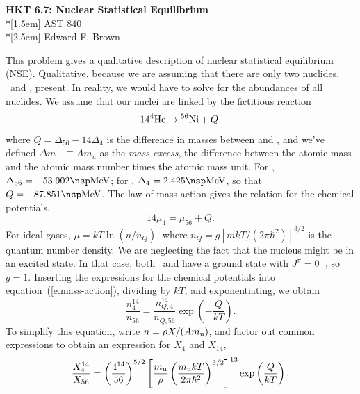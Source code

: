 \documentclass[11pt]{article}
\begin{document}
\newcommand{\thetitle}{HKT 6.7: Nuclear Statistical Equilibrium}
\newcommand{\thecourse}{AST 840}
\newcommand{\theauthor}{Edward F. Brown}

\begin{titlepage}
\begin{center}
\LARGE{\textbf{\thetitle}}\\*[1.5em]
\Large{\thecourse}\\*[2.5em]
\large{\theauthor}
\end{center}
\end{titlepage}

This problem gives a qualitative description of nuclear statistical equilibrium (NSE).  Qualitative, because we are assuming that there are only two nuclides, \helium\ and \nickel[56], present. In reality, we would have to solve for the abundances of all nuclides.  We assume that our nuclei are linked by the fictitious reaction
\begin{equation}\label{e.chem}
14\helium \to \nickel[56] + Q,
\end{equation}
where $Q = \Delta_{56} - 14\Delta_{4}$ is the difference in masses between \nickel[56] and \helium, and we've defined $\Delta m - \equiv A m_{u}$ as the \emph{mass excess}, the difference between the atomic mass and the atomic mass number times the atomic mass unit.  For \nickel[56], $\Delta_{56} = -53.902\nsp\MeV$; for \helium, $\Delta_{4} = 2.425\nsp\MeV$, so that $Q = -87.851\nsp\MeV$. The law of mass action gives the relation for the chemical potentials,
\begin{equation}\label{e.mass-action}
14\mu_{4} = \mu_{56} + Q.
\end{equation}
For ideal gases, $\mu = kT\ln(n/n_{Q})$, where $n_{Q}=g[mkT/(2\pi\hbar^{2})]^{3/2}$ is the quantum number density.  We are neglecting the fact that the nucleus might be in an excited state. In that case, both \helium\ and \nickel[56] have a ground state with $J^{\pi} = 0^{+}$, so $g = 1$.  Inserting the expressions for the chemical potentials into equation~(\ref{e.mass-action}), dividing by $kT$, and exponentiating, we obtain
\begin{equation}\label{e.nse-1}
\frac{n_{4}^{14}}{n_{56}} = \frac{n_{Q,4}^{14}}{n_{Q,56}} \exp\left(-\frac{Q}{kT}\right).
\end{equation}
To simplify this equation, write $n = \rho X/(A\mb)$, and factor out common expressions to obtain an expression for $X_{4}$ and $X_{14}$,
\begin{equation}\label{e.nse-2}
\frac{X_{4}^{14}}{X_{56}} = \left(\frac{4^{14}}{56}\right)^{5/2}\left[\frac{\mb}{\rho}\left(\frac{\mb kT}{2\pi\hbar^{2}}\right)^{3/2}\right]^{13}\exp\left(\frac{Q}{kT}\right).
\end{equation}
\end{document}
